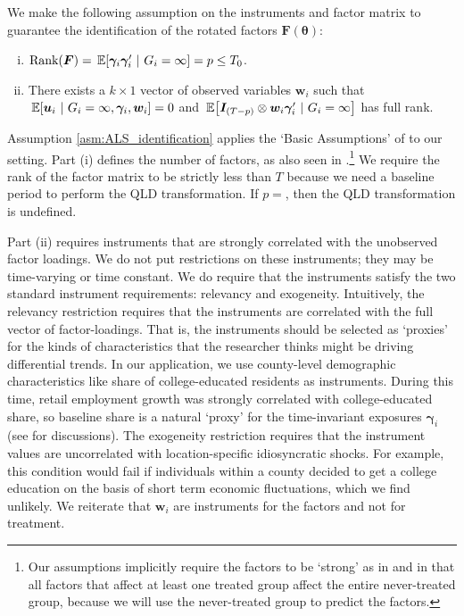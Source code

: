 \documentclass[12pt]{article}
\begin{document}
We make the following assumption on the instruments and factor matrix to guarantee the identification of the rotated factors $\bm F(\bm \theta)$:
\begin{assumption}\label{asm:ALS_identification}\text{ }
  \begin{enumerate}[(i)]
    \item $\text{Rank}(\bm{F}) = \expec{\bm \gamma_i \bm \gamma_i'}{G_i = \infty} = p \leq T_0$.  
    \item There exists a $k \times 1$ vector of observed variables $\bm w_i$ such that $\expec{\bm u_i}{G_i = \infty, \bm \gamma_i, \bm w_i} = 0$ and $\expec{\bm I_{(T - p)} \otimes \bm w_i \bm \gamma_i'}{G_i = \infty}$ has full rank.
  \end{enumerate}
\end{assumption}
Assumption \ref{asm:ALS_identification} applies the `Basic Assumptions' of \citet{Ahn_Lee_Schmidt_2013} to our setting. Part (i) defines the number of factors, as also seen in \citet{Bai_2009}.\footnote{Our assumptions implicitly require the factors to be `strong' as in \citet{Bai_2009} and \citet{Ahn_Lee_Schmidt_2013} in that all factors that affect at least one treated group affect the entire never-treated group, because we will use the never-treated group to predict the factors.} We require the rank of the factor matrix to be strictly less than $T$ because we need a baseline period to perform the QLD transformation. If $p = $, then the QLD transformation is undefined. 

Part (ii) requires instruments that are strongly correlated with the unobserved factor loadings. 
We do not put restrictions on these instruments; they may be time-varying or time constant. 
We do require that the instruments satisfy the two standard instrument requirements: relevancy and exogeneity. 
Intuitively, the relevancy restriction requires that the instruments are correlated with the full vector of factor-loadings. 
That is, the instruments should be selected as `proxies' for the kinds of characteristics that the researcher thinks might be driving differential trends.
In our application, we use county-level demographic characteristics like share of college-educated residents as instruments. During this time, retail employment growth was strongly correlated with college-educated share, so baseline share is a natural `proxy' for the time-invariant exposures $\bm \gamma_i$ (see \citet{hatch2000job} for discussions). The exogeneity restriction requires that the instrument values are uncorrelated with location-specific idiosyncratic shocks. For example, this condition would fail if individuals within a county decided to get a college education on the basis of short term economic fluctuations, which we find unlikely. We reiterate that $\bm w_i$ are instruments for the factors and not for treatment.
\end{document}
